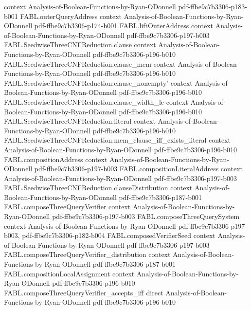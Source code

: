 \begin{theorem}
  {context}
  {Analysis-of-Boolean-Functions-by-Ryan-ODonnell}
  {pdf-ffbe9c7b3306-p183-b001}
\proofstep
  {FABL.outerQueryAddress}
  {context}
  {Analysis-of-Boolean-Functions-by-Ryan-ODonnell}
  {pdf-ffbe9c7b3306-p174-b001}
\proofstep
  {FABL.liftOuterAddress}
  {context}
  {Analysis-of-Boolean-Functions-by-Ryan-ODonnell}
  {pdf-ffbe9c7b3306-p197-b003}
\proofstep
  {FABL.SeedwiseThreeCNFReduction.clause}
  {context}
  {Analysis-of-Boolean-Functions-by-Ryan-ODonnell}
  {pdf-ffbe9c7b3306-p196-b010}
\proofstep
  {FABL.SeedwiseThreeCNFReduction.clause_mem}
  {context}
  {Analysis-of-Boolean-Functions-by-Ryan-ODonnell}
  {pdf-ffbe9c7b3306-p196-b010}
\proofstep
  {FABL.SeedwiseThreeCNFReduction.clause_nonempty'}
  {context}
  {Analysis-of-Boolean-Functions-by-Ryan-ODonnell}
  {pdf-ffbe9c7b3306-p196-b010}
\proofstep
  {FABL.SeedwiseThreeCNFReduction.clause_width_le}
  {context}
  {Analysis-of-Boolean-Functions-by-Ryan-ODonnell}
  {pdf-ffbe9c7b3306-p196-b010}
\proofstep
  {FABL.SeedwiseThreeCNFReduction.literal}
  {context}
  {Analysis-of-Boolean-Functions-by-Ryan-ODonnell}
  {pdf-ffbe9c7b3306-p196-b010}
\proofstep
  {FABL.SeedwiseThreeCNFReduction.mem_clause_iff_exists_literal}
  {context}
  {Analysis-of-Boolean-Functions-by-Ryan-ODonnell}
  {pdf-ffbe9c7b3306-p196-b010}
\proofstep
  {FABL.compositionAddress}
  {context}
  {Analysis-of-Boolean-Functions-by-Ryan-ODonnell}
  {pdf-ffbe9c7b3306-p197-b003}
\proofstep
  {FABL.compositionLiteralAddress}
  {context}
  {Analysis-of-Boolean-Functions-by-Ryan-ODonnell}
  {pdf-ffbe9c7b3306-p197-b003}
\proofstep
  {FABL.SeedwiseThreeCNFReduction.clauseDistribution}
  {context}
  {Analysis-of-Boolean-Functions-by-Ryan-ODonnell}
  {pdf-ffbe9c7b3306-p187-b001}
\proofstep
  {FABL.composeThreeQueryVerifier}
  {context}
  {Analysis-of-Boolean-Functions-by-Ryan-ODonnell}
  {pdf-ffbe9c7b3306-p197-b003}
\proofstep
  {FABL.composeThreeQuerySystem}
  {context}
  {Analysis-of-Boolean-Functions-by-Ryan-ODonnell}
  {pdf-ffbe9c7b3306-p197-b003,
    pdf-ffbe9c7b3306-p182-b004}
\proofstep
  {FABL.composedVerifierSeed}
  {context}
  {Analysis-of-Boolean-Functions-by-Ryan-ODonnell}
  {pdf-ffbe9c7b3306-p197-b003}
\proofstep
  {FABL.composeThreeQueryVerifier_distribution}
  {context}
  {Analysis-of-Boolean-Functions-by-Ryan-ODonnell}
  {pdf-ffbe9c7b3306-p187-b001}
\proofstep
  {FABL.compositionLocalAssignment}
  {context}
  {Analysis-of-Boolean-Functions-by-Ryan-ODonnell}
  {pdf-ffbe9c7b3306-p196-b010}
\proofstep
  {FABL.composeThreeQueryVerifier_accepts_iff}
  {direct}
  {Analysis-of-Boolean-Functions-by-Ryan-ODonnell}
  {pdf-ffbe9c7b3306-p196-b010}

\end{theorem}
